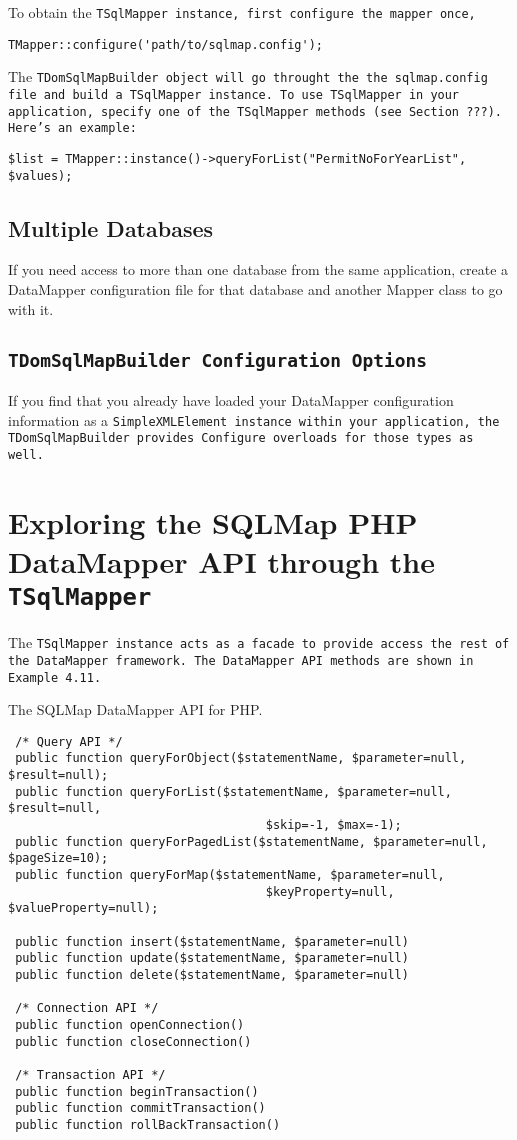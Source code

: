 To obtain the \tt{TSqlMapper} instance, first configure the mapper once,
\begin{verbatim}
TMapper::configure('path/to/sqlmap.config');
\end{verbatim}
The \tt{TDomSqlMapBuilder} object will go throught the the \tt{sqlmap.config}
file and build a \tt{TSqlMapper} instance. To use \tt{TSqlMapper} in your
application, specify one of the \tt{TSqlMapper} methods (see Section ???).
Here's an example:
\begin{verbatim}
$list = TMapper::instance()->queryForList("PermitNoForYearList", $values);
\end{verbatim}

\subsection{Multiple Databases}
If you need access to more than one database from the same application, create
a DataMapper configuration file for that database and another Mapper class to
go with it.

\subsection{\tt{TDomSqlMapBuilder} Configuration Options}
If you find that you already have loaded your DataMapper configuration
information as a \tt{SimpleXMLElement} instance within your application, the
\tt{TDomSqlMapBuilder} provides \tt{Configure} overloads for those types as
well.

\section{Exploring the SQLMap PHP DataMapper API through the \tt{TSqlMapper}}
The \tt{TSqlMapper} instance acts as a facade to provide access the rest of
the DataMapper framework. The DataMapper API methods are shown in Example
4.11.

\begin{example}
The SQLMap DataMapper API for PHP.
\begin{verbatim}
 /* Query API */
 public function queryForObject($statementName, $parameter=null, $result=null);
 public function queryForList($statementName, $parameter=null, $result=null,
                                    $skip=-1, $max=-1);
 public function queryForPagedList($statementName, $parameter=null, $pageSize=10);
 public function queryForMap($statementName, $parameter=null,
                                    $keyProperty=null, $valueProperty=null);

 public function insert($statementName, $parameter=null)
 public function update($statementName, $parameter=null)
 public function delete($statementName, $parameter=null)

 /* Connection API */
 public function openConnection()
 public function closeConnection()

 /* Transaction API */
 public function beginTransaction()
 public function commitTransaction()
 public function rollBackTransaction()
\end{verbatim}
\end{example}

